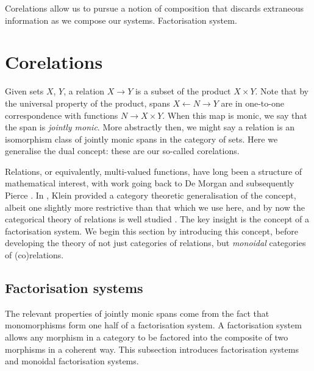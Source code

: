 Corelations allow us to pursue a notion of composition that discards extraneous
information as we compose our systems. 
Factorisation system.


\section{Corelations} \label{sec.corels}

Given sets $X$, $Y$, a relation $X \to Y$ is a subset of the product $X
\times Y$. Note that by the universal property of the product, spans $X
\leftarrow N \to Y$ are in one-to-one correspondence with functions $N \to X
\times Y$. When this map is monic, we say that the span is \emph{jointly monic}.
More abstractly then, we might say a relation is an isomorphism class of jointly
monic spans in the category of sets. Here we generalise the dual concept: these
are our so-called corelations.

Relations, or equivalently, multi-valued functions, have long been a structure
of mathematical interest, with work going back to De Morgan \cite{DeM60} and
subsequently Pierce \cite{Pie70}. In \cite{Kle70}, Klein provided a category
theoretic generalisation of the concept, albeit one slightly more restrictive
than that which we use here, and by now the categorical theory of relations is
well studied \cite{Mil00, JW00}. The key insight is the concept of a
factorisation system. We begin this section by introducing this concept, before
developing the theory of not just categories of relations, but \emph{monoidal}
categories of (co)relations.

\subsection{Factorisation systems}
The relevant properties of jointly monic spans come from the fact that
monomorphisms form one half of a factorisation system. A factorisation system
allows any morphism in a category to be factored into the composite of two
morphisms in a coherent way. This subsection introduces factorisation systems
and monoidal factorisation systems.

